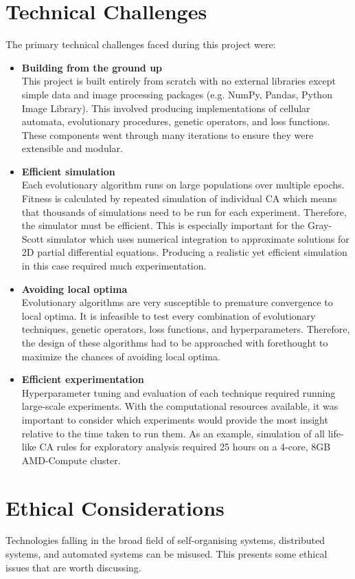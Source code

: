 
\section{Technical Challenges}
The primary technical challenges faced during this project were:
\begin{itemize}
    \item \textbf{Building from the ground up}\\ This project is built entirely from scratch with no external libraries except simple data and image processing packages (e.g. NumPy, Pandas, Python Image Library). This involved producing implementations of cellular automata, evolutionary procedures, genetic operators, and loss functions. These components went through many iterations to ensure they were extensible and modular.
    \item \textbf{Efficient simulation}\\ Each evolutionary algorithm runs on large populations over multiple epochs. Fitness is calculated by repeated simulation of individual CA which means that thousands of simulations need to be run for each experiment. Therefore, the simulator must be efficient. This is especially important for the Gray-Scott simulator which uses numerical integration to approximate solutions for 2D partial differential equations. Producing a realistic yet efficient simulation in this case required much experimentation.
    \item \textbf{Avoiding local optima}\\ Evolutionary algorithms are very susceptible to premature convergence to local optima. It is infeasible to test every combination of evolutionary techniques, genetic operators, loss functions, and hyperparameters. Therefore, the design of these algorithms had to be approached with forethought to maximize the chances of avoiding local optima. 
    \item \textbf{Efficient experimentation}\\ Hyperparameter tuning and evaluation of each technique required running large-scale experiments. With the computational resources available, it was important to consider which experiments would provide the most insight relative to the time taken to run them. As an example, simulation of all life-like CA rules for exploratory analysis required 25 hours on a 4-core, 8GB AMD-Compute cluster.
\end{itemize}

\section{Ethical Considerations}
Technologies falling in the broad field of self-organising systems, distributed systems, and automated systems can be misused. This presents some ethical issues that are worth discussing.\\

